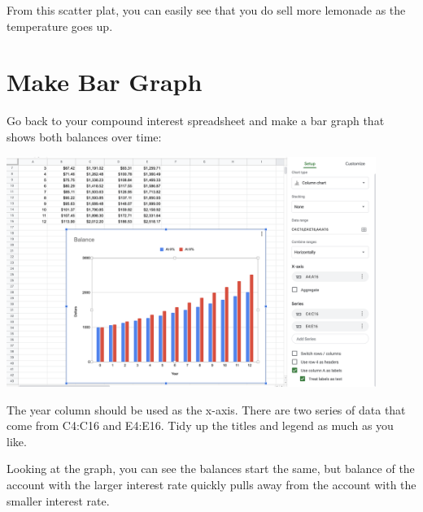 From this scatter plat, you can easily see that you do sell more
lemonade as the temperature goes up.


\section{Make Bar Graph}

Go back to your compound interest spreadsheet and make a bar graph
that shows both balances over time:

\includegraphics[width=0.9\textwidth]{InterestGraph.png}

The year column should be used as the x-axis. There are two series of
data that come from C4:C16 and E4:E16.  Tidy up the titles and legend
as much as you like.

Looking at the graph, you can see the balances start the same, but
balance of the account with the larger interest rate quickly pulls
away from the account with the smaller interest rate.

